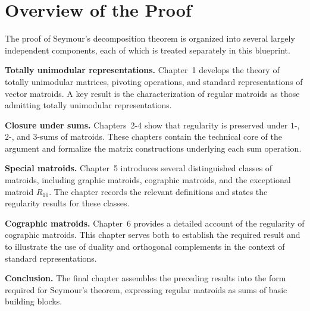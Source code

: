 \section{Overview of the Proof}

The proof of Seymour's decomposition theorem is organized into several largely independent components, each of which is treated separately in this blueprint.

\medskip

\noindent
\textbf{Totally unimodular representations.}  
Chapter~1 develops the theory of totally unimodular matrices, pivoting operations, and standard representations of vector matroids.  
A key result is the characterization of regular matroids as those admitting totally unimodular representations.

\medskip

\noindent
\textbf{Closure under sums.}  
Chapters~2-4 show that regularity is preserved under $1$-, $2$-, and $3$-sums of matroids.  
These chapters contain the technical core of the argument and formalize the matrix constructions underlying each sum operation.

\medskip

\noindent
\textbf{Special matroids.}  
Chapter~5 introduces several distinguished classes of matroids, including graphic matroids, cographic matroids, and the exceptional matroid $R_{10}$.  
The chapter records the relevant definitions and states the regularity results for these classes.

\medskip

\noindent
\textbf{Cographic matroids.}  
Chapter~6 provides a detailed account of the regularity of cographic matroids.  
This chapter serves both to establish the required result and to illustrate the use of duality and orthogonal complements in the context of standard representations.

\medskip

\noindent
\textbf{Conclusion.}  
The final chapter assembles the preceding results into the form required for Seymour's theorem, expressing regular matroids as sums of basic building blocks.
